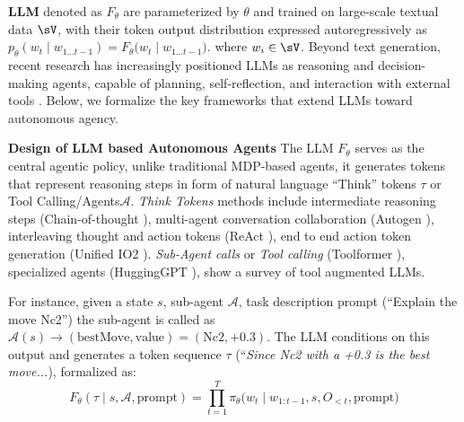 \documentclass{article}
\theoremstyle{plain}
\theoremstyle{definition}
\theoremstyle{remark}
\begin{document}
\textbf{LLM} denoted as \(F_{\theta}\) are parameterized by $\theta$ and trained on large-scale textual data \(\sV\), with their token output distribution expressed autoregressively as
\(
p_{\theta}(w_{t} \mid w_{1\ldots t-1}) = F_{\theta}\bigl(w_{t}\;\big|\;w_{1\ldots t-1}\bigr).
\) where $w_i \in \sV$. Beyond text generation, recent research has increasingly positioned LLMs as reasoning and decision-making agents, capable of planning, self-reflection, and interaction with external tools \cite{liu2023agentbench}. Below, we formalize the key frameworks that extend LLMs toward autonomous agency.

\textbf{Design of LLM based Autonomous Agents} The LLM \(F_{\theta}\) serves as the central agentic policy, unlike traditional MDP-based agents, it generates tokens that represent reasoning steps in form of natural language ``Think'' tokens \(\tau\) or Tool Calling/Agents$\mathcal{A}$. \textit{Think Tokens} methods include intermediate reasoning steps (Chain-of-thought  \cite{wei2022chain}), multi-agent conversation collaboration (Autogen \cite{wu2023autogen}), interleaving thought and action tokens (ReAct \cite{yao2022react}), end to end action token generation (Unified IO2 \cite{lu2024unified}). \textit{Sub-Agent calls} or \textit{Tool calling} (Toolformer \cite{schick2023toolformerlanguagemodelsteach}), specialized agents (HuggingGPT \cite{shen2024hugginggpt}), \citet{mialon2023augmented,ma2024sciagenttoolaugmentedlanguagemodels} show a survey of tool augmented LLMs.

For instance, given a state \(s\), sub-agent $\mathcal{A}$, task description prompt (``Explain the move Nc2'') the sub-agent is called as \(\mathcal{A}(s)\rightarrow(\mathrm{bestMove}, \mathrm{value}) = (\text{Nc2}, +0.3)\). The LLM conditions on this output and generates a token sequence \(\tau\) (``\textit{Since Nc2 with a +0.3 is the best move...}), formalized as:
\vspace{-2mm}
\begin{equation}
    F_\theta(\tau \mid s, \mathcal{A},\text{prompt}) = \prod_{t=1}^T \pi_\theta\bigl(w_t \mid w_{1:t-1}, s, O_{<t},\text{prompt}\bigr)
\label{eq:agentic_policy}
\end{equation}
\end{document}
